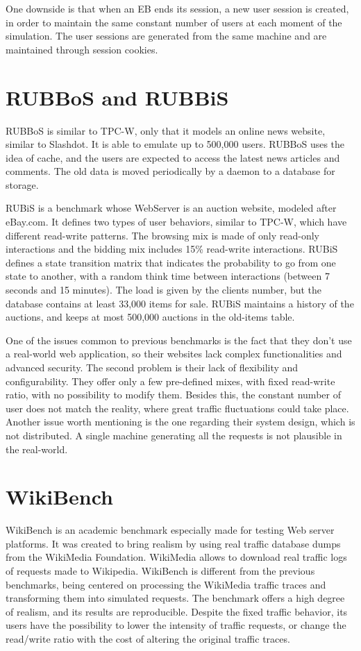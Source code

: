 One downside is that when an EB ends its session, a new user session is created, in order to maintain the same constant number of users at each moment of the simulation. The user sessions are generated from the same machine and are maintained through session cookies.

\section{RUBBoS and RUBBiS}
\label{sec:rubbos-rubbis}

RUBBoS is similar to TPC-W, only that it models an online news website, similar to Slashdot. It is able to emulate up to 500,000 users. RUBBoS uses the idea of cache, and the users are expected to access the latest news articles and comments. The old data is moved periodically by a daemon to a database for storage.

RUBiS is a benchmark whose WebServer is an auction website, modeled after eBay.com. It defines two types of user behaviors, similar to TPC-W, which have different read-write patterns. The browsing mix is made of only read-only interactions and the bidding mix includes 15\% read-write interactions. RUBiS defines a state transition matrix that indicates the probability to go from one state to another, with a random think time between interactions (between 7 seconds and 15 minutes). The load is given by the clients number, but the database contains at least 33,000 items for sale.  RUBiS maintains a history of the auctions, and keeps at most 500,000 auctions in the old-items table.

One of the issues common to previous benchmarks is the fact that they don't use a real-world web application, so their websites lack complex functionalities and advanced security. The second problem is their lack of flexibility and configurability. They offer only a few pre-defined mixes, with fixed read-write ratio, with no possibility to modify them. Besides this, the constant number of user does not match the reality, where great traffic fluctuations could take place. Another issue worth mentioning is the one regarding their system design, which is not distributed. A single machine generating all the requests is not plausible in the real-world.

\section{WikiBench}
\label{sec:wikibench}

WikiBench is an academic benchmark especially made for testing Web server platforms. It was created to bring realism by using real traffic database dumps from the WikiMedia Foundation. WikiMedia allows to download real traffic logs of requests made to Wikipedia.  WikiBench is different from the previous benchmarks, being centered on processing the WikiMedia traffic traces and transforming them into simulated requests. The benchmark offers a high degree of realism, and its results are reproducible. Despite the fixed traffic behavior, its users have the possibility to lower the intensity of traffic requests, or change the read/write ratio with the cost of altering the original traffic traces.

